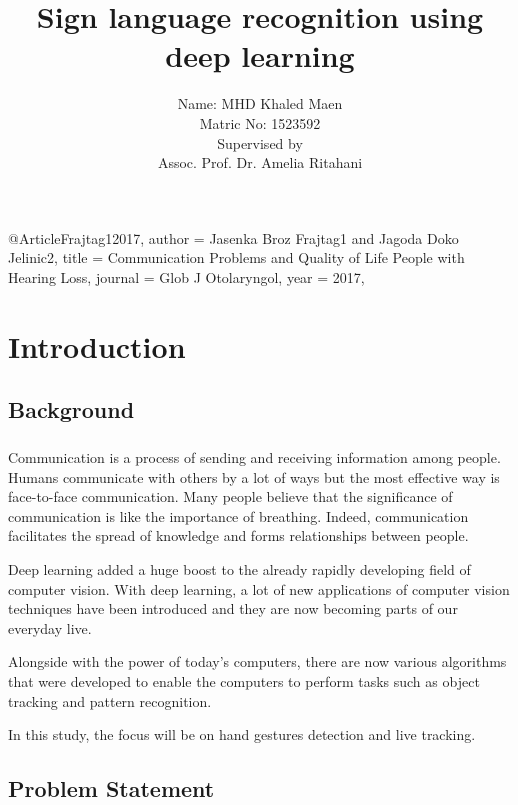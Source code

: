 \documentclass[12pt]{report}
\title{Sign language recognition using deep learning}
\author{ Name: MHD Khaled Maen\\
        Matric No: 1523592 \\ 
        [1.5cm]
        Supervised by\\
        Assoc. Prof. Dr. Amelia Ritahani \\}
\begin{document}
    @Article{Frajtag12017,
        author  = {Jasenka Broz Frajtag1 and Jagoda Doko Jelinic2},
        title   = {Communication Problems and Quality of Life People with Hearing Loss},
        journal = {Glob J Otolaryngol},
        year    = {2017},
    }
    \maketitle
    \setcounter{page}{2}                    
    \tableofcontents
    \newpage
    \chapter{Introduction} 
        \section{Background}
            \paragraph{}
                Communication is a process of sending and receiving information among people. 
                Humans communicate with others by a lot of ways but the most effective way is 
                face-to-face communication. Many people believe that the significance of communication 
                is like the importance of breathing. Indeed, communication facilitates the spread of knowledge
                and forms relationships between people.
            
                Deep learning added a huge boost to the already rapidly developing field of computer vision.
                With deep learning, a lot of new applications of computer vision techniques have been introduced
                and they are now becoming parts of our everyday live.
            
                Alongside  with  the power of today's computers, there are now various algorithms that were developed 
                to enable the computers to perform tasks such as object tracking and pattern recognition. 
                
                In this study, the focus will be on hand gestures detection and live tracking.

        \section{Problem Statement}
\end{document}

